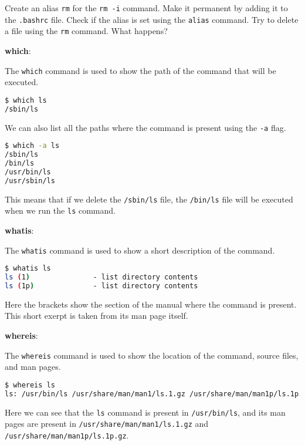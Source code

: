 \begin{exercise}
  Create an alias \lstinline|rm| for the \lstinline|rm -i| command.
  Make it permanent by adding it to the \lstinline|.bashrc| file.
  Check if the alias is set using the \lstinline|alias| command.
  Try to delete a file using the \lstinline|rm| command.
  What happens?
\end{exercise}

\textbf{which}:

The \lstinline|which| command is used to show the path of the command that will be executed.

\begin{lstlisting}[language=bash]
$ which ls
/sbin/ls
\end{lstlisting}

We can also list all the paths where the command is present using the \lstinline|-a| flag.

\begin{lstlisting}[language=bash]
$ which -a ls
/sbin/ls
/bin/ls
/usr/bin/ls
/usr/sbin/ls
\end{lstlisting}

This means that if we delete the \lstinline|/sbin/ls| file, the \lstinline|/bin/ls| file will be executed when we run the \lstinline|ls| command.

\textbf{whatis}:

The \lstinline|whatis| command is used to show a short description of the command.

\begin{lstlisting}[language=bash]
$ whatis ls
ls (1)               - list directory contents
ls (1p)              - list directory contents
\end{lstlisting}

Here the brackets show the section of the manual where the command is present.
This short exerpt is taken from its man page itself.

\textbf{whereis}:

The \lstinline|whereis| command is used to show the location of the command, source
files, and man pages.

\begin{lstlisting}[language=bash]
$ whereis ls
ls: /usr/bin/ls /usr/share/man/man1/ls.1.gz /usr/share/man/man1p/ls.1p.gz
\end{lstlisting}

Here we can see that the \lstinline|ls| command is present in \lstinline|/usr/bin/ls|,
and its man pages are present in \lstinline|/usr/share/man/man1/ls.1.gz| and
\lstinline|/usr/share/man/man1p/ls.1p.gz|.

